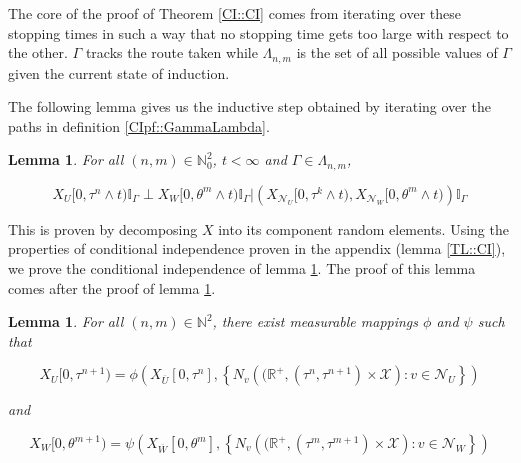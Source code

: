 \documentclass[12pt]{article}
\newcommand{\mb}{\mathbb}
\newcommand{\mc}{\mathcal}
\newcommand{\ov}{\overline}
\newcommand{\ind}{\hspace{24pt}}
\newcommand{\sta}{\mc{X}}							%
\newcommand{\neigh}[1]{\mc{N}_{#1}}					%
\newcommand{\cl}[1]{\ov{#1}}						%
\newcommand{\indx}[1]{^{#1}}						%
\newcommand{\Xf}{X}									%
\newcommand{\poiss}{N}								%
\newcommand{\poissv}[1]{_{#1}}						%
\newcommand{\vind}[1]{_{#1}}						%
\newcommand{\tmi}[1]{#1}							%
\newcommand{\rt}{\tau}								%
\newcommand{\seto}{U}								%
\newcommand{\sett}{W}								%
\newcommand{\rtt}{\theta}							%
\newcommand{\apath}{\Gamma}						%
\newcommand{\pathset}[2]{\Lambda_{#1,#2}}		%
\newcommand{\indo}{n}							%
\newcommand{\indt}{m}							%
\newtheorem{lem}[thms]{Lemma}
\begin{document}
The core of the proof of Theorem \ref{CI::CI} comes from iterating over these stopping times in such a way that no stopping time gets too large with respect to the other. \(\apath\) tracks the route taken while \(\pathset{\indo}{\indt}\) is the set of all possible values of \(\apath\) given the current state of induction.

\ind The following lemma gives us the inductive step obtained by iterating over the paths in definition \ref{CIpf::GammaLambda}.

\begin{lem}
For all \((\indo,\indt)\in \mb{N}_0^2\), \(t < \infty\) and \(\apath \in \pathset{\indo}{\indt}\),

\[\Xf\vind{\seto}\tmi{[0,\rt\indx{\indo}\wedge t)}\mb{I}_{\apath}\perp \Xf\vind{\sett}\tmi{[0,\rtt\indx{\indt}\wedge t)}\mb{I}_{\apath}|\left(\Xf\vind{\neigh{\seto}}\tmi{[0,\rt\indx{k}\wedge t)},\Xf\vind{\neigh{\sett}}\tmi{[0,\rtt\indx{\indt}\wedge t)}\right)\mb{I}_{\apath}\]
\label{CIpf::Induction}
\end{lem}

This is proven by decomposing \(\Xf\) into its component random elements. Using the properties of conditional independence proven in the appendix (lemma \ref{TL::CI}), we prove the conditional independence of lemma \ref{CIpf::Induction}. The proof of this lemma comes after the proof of lemma \ref{CIpf::Decomposition}.

\begin{lem}
For all \((\indo,\indt)\in \mb{N}^2\), there exist measurable mappings \(\phi\) and \(\psi\) such that 

\begin{equation}
\Xf\vind{\seto}\tmi{[0,\rt\indx{\indo+1})} = \phi\left(\Xf\vind{\cl{\seto}}\tmi{[0,\rt\indx{\indo}]}, \left\{\poiss\poissv{v}\left((\mb{R}^+,(\rt\indx{\indo},\rt\indx{\indo+1})\times \sta\right):v \in \neigh{\seto}\right\}\right)
\label{CIpf::XU forward map}
\end{equation}

and

\begin{equation}
\Xf\vind{\sett}\tmi{[0,\rtt\indx{\indt+1})} = \psi\left(\Xf\vind{\cl{\sett}}\tmi{[0,\rtt\indx{\indt}]}, \left\{\poiss\poissv{v}\left((\mb{R}^+,(\rt\indx{\indt},\rt\indx{\indt+1})\times \sta\right):v \in \neigh{\sett}\right\}\right)
\label{CIpf::XW forward map}
\end{equation}

\label{CIpf::Decomposition}
\end{lem}
\end{document}
